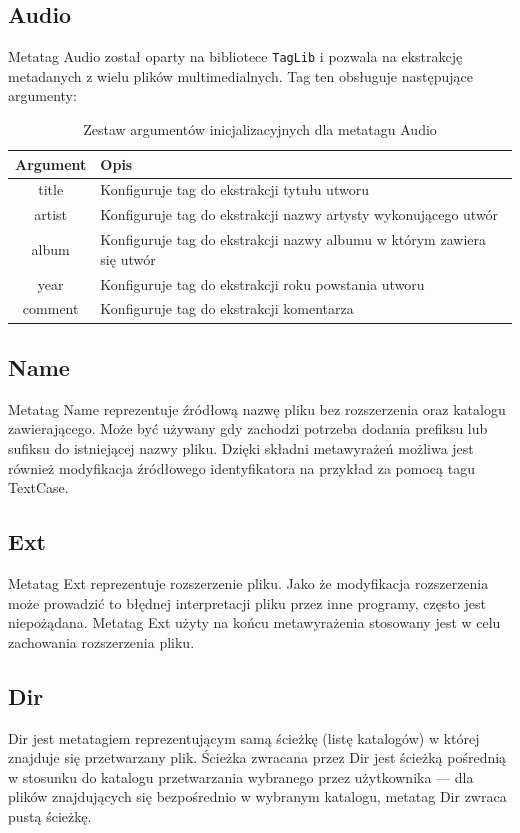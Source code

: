 \subsection{Audio}
Metatag Audio został oparty na bibliotece \texttt{TagLib} i pozwala na ekstrakcję metadanych z wielu plików multimedialnych.
Tag ten obsługuje następujące argumenty:
\begin{table}[h]
\begin{center}
\begin{tabular}{| c | p{13cm} |}
\hline
\textbf{Argument} & \textbf{Opis} \\
\hline
title & Konfiguruje tag do ekstrakcji tytułu utworu \\
artist & Konfiguruje tag do ekstrakcji nazwy artysty wykonującego utwór \\
album & Konfiguruje tag do ekstrakcji nazwy albumu w którym zawiera się utwór \\
year & Konfiguruje tag do ekstrakcji roku powstania utworu \\
comment & Konfiguruje tag do ekstrakcji komentarza \\
\hline

\end{tabular}
\caption{Zestaw argumentów inicjalizacyjnych dla metatagu \textsf{Audio}}
\end{center}
\end{table}

\subsection{Name}
Metatag Name reprezentuje źródłową nazwę pliku bez rozszerzenia oraz katalogu zawierającego. Może być używany gdy zachodzi potrzeba dodania prefiksu lub sufiksu do istniejącej nazwy pliku. Dzięki składni metawyrażeń możliwa jest również modyfikacja źródłowego identyfikatora na przykład za pomocą tagu TextCase.

\subsection{Ext}
Metatag Ext reprezentuje rozszerzenie pliku. Jako że modyfikacja rozszerzenia może prowadzić to błędnej interpretacji pliku przez inne programy, często jest niepożądana. Metatag Ext użyty na końcu metawyrażenia stosowany jest w celu zachowania rozszerzenia pliku.

\subsection{Dir}
Dir jest metatagiem reprezentującym samą ścieżkę (listę katalogów) w której znajduje się przetwarzany plik. Ścieżka zwracana przez Dir jest ścieżką pośrednią w stosunku do katalogu przetwarzania wybranego przez użytkownika --- dla plików znajdujących się bezpośrednio w wybranym katalogu, metatag Dir zwraca pustą ścieżkę.

